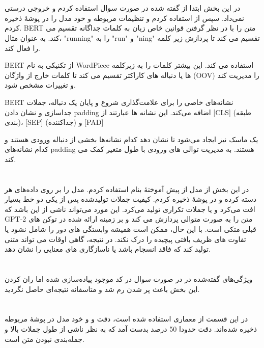 \section{}
در این بخش ابتدا از  گفته شده در صورت سوال استفاده کردم و خروجی درستی نمی‌داد. سپس از  استفاده کردم و تنظیمات مربوطه و خود مدل را در پوشۀ  ذخیره کردم.
BERT متن را با در نظر گرفتن قوانین خاص زبان به کلمات جداگانه تقسیم می کند. به عنوان مثال، "running" را به "run" و "ning" تقسیم می کند تا پردازش زیر کلمه را فعال کند.

BERT از تکنیکی به نام WordPiece استفاده می کند. این بیشتر کلمات را به زیرکلمه ها یا دنباله های کاراکتر تقسیم می کند تا کلمات خارج از واژگان (OOV) را مدیریت کند و تغییرات مشخص شود.

BERT نشانه‌های خاصی را برای علامت‌گذاری شروع و پایان یک دنباله، جملات جداسازی و نشان دادن padding اضافه می‌کند. این نشانه ها عبارتند از [CLS] (طبقه بندی)، [SEP] (جداکننده) و [PAD]

 یک ماسک  نیز ایجاد می‌شود تا نشان دهد کدام نشانه‌ها بخشی از دنباله ورودی هستند و کدام نشانه‌های padding هستند. به مدیریت توالی های ورودی با طول متغیر کمک می کند.

\clearpage
 \section{}
 در این بخش از مدل از پیش آموختۀ  بنام  استفاده کردم. مدل را بر روی داده‌های هر دسته  کرده و در پوشۀ  ذخیره کردم. کیفیت جملات تولیدشده پس از یکی دو خط بسیار افت می‌کرد و یا جملات تکراری تولید می‌کرد. این مورد می‌تواند ناشی از این باشد که 
 GPT-2 متن را به صورت متوالی پردازش می کند و بر زمینه ارائه شده در توکن های قبلی متکی است. با این حال، ممکن است همیشه وابستگی های دور را شامل نشود یا تفاوت های ظریف بافتی پیچیده را درک نکند. در نتیجه، گاهی اوقات می تواند متنی تولید کند که فاقد انسجام باشد یا ناسازگاری های معنایی را نشان دهد.

 \section{}
 ویژگی‌های گفته‌شده در در صورت سوال در کد موجود پیاده‌سازی شده اما ران کردن این بخش باعث پر شدن رم  شد و متاسفانه نتیجه‌ای حاصل نگردید.

 \section{}
 در این قسمت از معماری  استفاده شده است، دقت و  و خود مدل در پوشۀ مربوطه ذخیره شده‌اند.
 دقت حدودا 50 درصد بدست آمد که به نظر ناشی از طول جملات بالا و جمله‌بندی نبودن متن است. 

